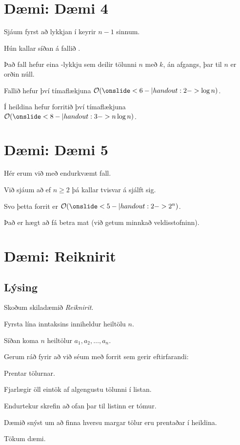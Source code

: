 \section{Dæmi: Dæmi 4}
{
    {
        \item<2-> Sjáum fyrst að lykkjan í  keyrir $n - 1$ sinnum.
        \item<3-> Hún kallar síðan á fallið .
        \item<4-> Það fall hefur eina -lykkju sem deilir tölunni $n$ með $k$, án afgangs, þar til $n$ er orðin núll.
        \item<5-> Fallið  hefur því tímaflækjuna $\mathcal{O}(\onslide<6- | handout:2->{\log n})$.
        \item<7-> Í heildina hefur forritið því tímaflækjuna $\mathcal{O}(\onslide<8- | handout:3->{n \log n})$.
    }
}

\section{Dæmi: Dæmi 5}
{
    {
        \item<2-> Hér erum við með endurkvæmt fall.
        \item<3-> Við sjáum að ef $n \geq 2$ þá kallar  tvisvar á sjálft sig.
        \item<4-> Svo þetta forrit er $\mathcal{O}(\onslide<5- | handout:2->{2^n})$.
        \item<6-> Það er hægt að fá betra mat (við getum minnkað veldisstofninn).
    }
}

\section{Dæmi: Reiknirit}
\subsection{Lýsing}
{
    {
        \item<1-> Skoðum skiladæmið \emph{Reiknirit}.
        \item<2-> Fyrsta lína inntaksins inniheldur heiltölu $n$.
        \item<3-> Síðan koma $n$ heiltölur $a_1, a_2, \dots, a_n$.
        \item<4-> Gerum ráð fyrir að við séum með forrit sem gerir eftirfarandi:
        {
            \item<5-> Prentar tölurnar.
            \item<6-> Fjarlægir öll eintök af algengustu tölunni í listan.
            \item<7-> Endurtekur skrefin að ofan þar til listinn er tómur.
        }
        \item<8-> Dæmið snýst um að finna hversu margar tölur eru prentaðar í heildina.
        \item<9-> Tökum dæmi.
    }
}


